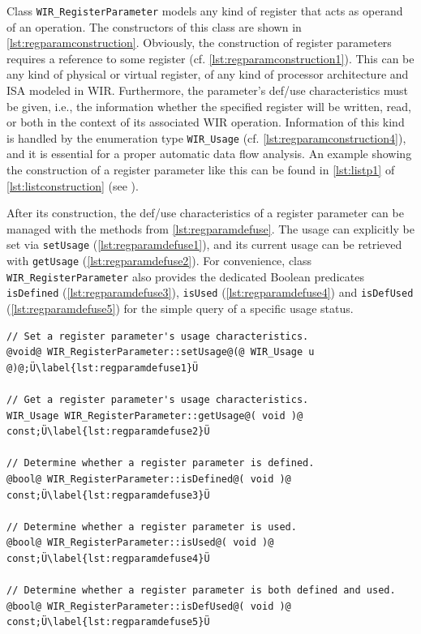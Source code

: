 Class \texttt{WIR\_RegisterParameter} models any kind of register that acts as operand of an operation.
The constructors of this class are shown in \cref{lst:regparamconstruction}.
Obviously, the construction of register parameters requires a reference to some register (cf. \cref{lst:regparamconstruction1}).
This can be any kind of physical or virtual register, of any kind of processor architecture and \gls{ISA} modeled in \gls{WIR}.
Furthermore, the parameter's def/use characteristics must be given, i.e., the information whether the specified register will be written, read, or both in the context of its associated \gls{WIR} operation.
Information of this kind is handled by the enumeration type \texttt{WIR\_Usage} (cf. \cref{lst:regparamconstruction4}), and it is essential for a proper automatic data flow analysis.
An example showing the construction of a register parameter like this can be found in \cref{lst:listp1} of \cref{lst:listconstruction} (see ).

After its construction, the def/use characteristics of a register parameter can be managed with the methods from \cref{lst:regparamdefuse}.
The usage can explicitly be set via \texttt{setUsage} (\cref{lst:regparamdefuse1}), and its current usage can be retrieved with \texttt{getUsage} (\cref{lst:regparamdefuse2}).
For convenience, class \texttt{WIR\_RegisterParameter} also provides the dedicated Boolean predicates \texttt{isDefined} (\cref{lst:regparamdefuse3}), \texttt{isUsed} (\cref{lst:regparamdefuse4}) and \texttt{isDefUsed} (\cref{lst:regparamdefuse5}) for the simple query of a specific usage status.

\begin{lstlisting}[style=code,float=t,caption={Usage Handling of Class \texttt{WIR\_RegisterParameter}},label=lst:regparamdefuse]
// Set a register parameter's usage characteristics.
@void@ WIR_RegisterParameter::setUsage@(@ WIR_Usage u @)@;Ü\label{lst:regparamdefuse1}Ü

// Get a register parameter's usage characteristics.
WIR_Usage WIR_RegisterParameter::getUsage@( void )@ const;Ü\label{lst:regparamdefuse2}Ü

// Determine whether a register parameter is defined.
@bool@ WIR_RegisterParameter::isDefined@( void )@ const;Ü\label{lst:regparamdefuse3}Ü

// Determine whether a register parameter is used.
@bool@ WIR_RegisterParameter::isUsed@( void )@ const;Ü\label{lst:regparamdefuse4}Ü

// Determine whether a register parameter is both defined and used.
@bool@ WIR_RegisterParameter::isDefUsed@( void )@ const;Ü\label{lst:regparamdefuse5}Ü
\end{lstlisting}

